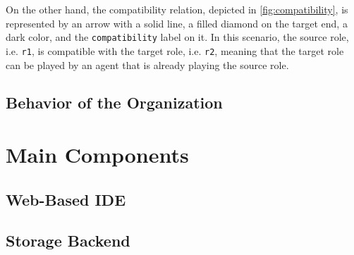 On the other hand, the compatibility relation, depicted in \cref{fig:compatibility}, is represented by an arrow with a solid line, a filled diamond on the target end, a dark color, and the \texttt{compatibility} label on it.
In this scenario, the source role, i.e. \texttt{r1}, is compatible with the target role, i.e. \texttt{r2}, meaning that the target role can be played by an agent that is already playing the source role.

\subsection{Behavior of the Organization}



\section{Main Components}
\subsection{Web-Based IDE}
\subsection{Storage Backend}

